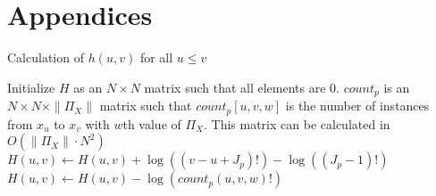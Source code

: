 



\section*{Appendices}

\begin{algorithm}
  \caption{ Calculation of $h(u,v)$ for all $u \leq v$}
  \label{alg:h}
  \begin{algorithmic}[1]
  \State Initialize $H$ as an $N \times N$ matrix such that all elements are 0.
  \State $count_p$ is an $N \times N \times \|\Pi_X\|$ matrix such that $count_p [u,v,w]$ is the number of instances from $x_u$ to $x_v$ with $w$th value of $\Pi_X$. This matrix can be calculated in $O(\|\Pi_X\| \cdot N^2)$
      \State $H(u,v) \leftarrow H(u,v) + \log((v-u + J_p)!) - \log((J_p -1)!)$
        \State $H(u,v) \leftarrow H(u,v) - \log( count_p(u,v,w)!)$
      \EndFor
    \EndFor
  \EndFor
    \State {}
  \EndFor
  \end{algorithmic}
\end{algorithm}



